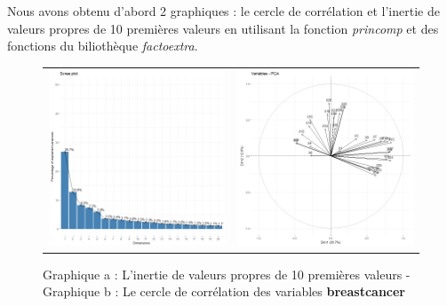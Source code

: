\documentclass[a4paper,11pt,oneside,roman]{article}
\begin{document}
Nous avons obtenu d'abord 2 graphiques : le cercle de corrélation et l'inertie de valeurs propres de 10 premières valeurs en utilisant la fonction \textit{princomp} et des fonctions du biliothèque \textit{factoextra}.
\begin{figure}[htb]
    \centering
    \begin{tabular}{c|c}
    \includegraphics[scale = .3]{./discrimination/ionosphere/eigplot.png} &
    \includegraphics[scale = .3]{discrimination/ionosphere/variable_plot.png}
    \end{tabular}
    \caption{Graphique a : L'inertie de valeurs propres de 10 premières valeurs - Graphique b : Le cercle de corrélation des variables \textbf{breastcancer}}
    \label{fig:my_label}
\end{figure}
\end{document}
